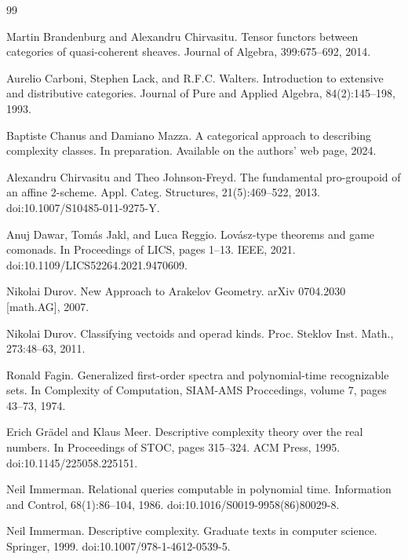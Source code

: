 \documentclass[10pt,a4paper]{amsart}
\begin{document}
\begin{thebibliography}{99}
\par\noindent  [7]  Martin Brandenburg and Alexandru Chirvasitu.  Tensor functors between categories of quasi-coherent sheaves.  Journal of Algebra, 399:675–692, 2014.  
 
\par\noindent  [8]  Aurelio Carboni, Stephen Lack, and R.F.C. Walters.  Introduction to extensive and distributive categories.  Journal of Pure and Applied Algebra, 84(2):145–198, 1993.  
 
\par\noindent  [9]  Baptiste Chanus and Damiano Mazza.  A categorical approach to describing complexity classes.  In preparation. Available on the authors’ web page, 2024.  
 
\par\noindent  [10]  Alexandru Chirvasitu and Theo Johnson-Freyd.  The fundamental pro-groupoid of an affine 2-scheme.  Appl. Categ. Structures, 21(5):469–522, 2013.  doi:10.1007/S10485-011-9275-Y.  
 
\par\noindent  [11]  Anuj Dawar, Tomás Jakl, and Luca Reggio.  Lovász-type theorems and game comonads.  In Proceedings of LICS, pages 1–13. IEEE, 2021.  doi:10.1109/LICS52264.2021.9470609.  
 
\par\noindent  [12]  Nikolai Durov.  New Approach to Arakelov Geometry.  arXiv 0704.2030 [math.AG], 2007.  
 
\par\noindent  [13]  Nikolai Durov.  Classifying vectoids and operad kinds.  Proc. Steklov Inst. Math., 273:48–63, 2011.  
 
\par\noindent  [14]  Ronald Fagin.  Generalized first-order spectra and polynomial-time recognizable sets.  In Complexity of Computation, SIAM-AMS Proccedings, volume 7, pages 43–73, 1974.  
 
\par\noindent  [15]  Erich Grädel and Klaus Meer.  Descriptive complexity theory over the real numbers.  In Proceedings of STOC, pages 315–324. ACM Press, 1995.  doi:10.1145/225058.225151.  
 
\par\noindent  [16]  Neil Immerman.  Relational queries computable in polynomial time.  Information and Control, 68(1):86–104, 1986.  doi:10.1016/S0019-9958(86)80029-8.  
 
\par\noindent  [17]  Neil Immerman.  Descriptive complexity.  Graduate texts in computer science. Springer, 1999.  doi:10.1007/978-1-4612-0539-5.  
 

\end{thebibliography}
\end{document}

